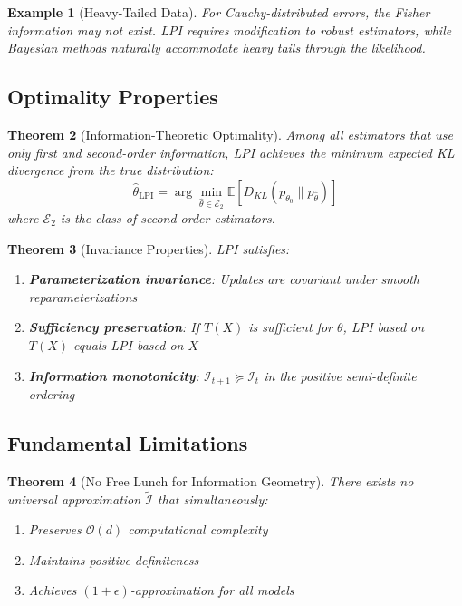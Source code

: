 \documentclass[11pt]{article}
\newtheorem{theorem}{Theorem}
\newtheorem{example}[theorem]{Example}
\begin{document}
\begin{example}[Heavy-Tailed Data]
For Cauchy-distributed errors, the Fisher information may not exist. LPI requires modification to robust estimators, while Bayesian methods naturally accommodate heavy tails through the likelihood.
\end{example}

\subsection{Optimality Properties}

\begin{theorem}[Information-Theoretic Optimality]
\label{thm:info_optimality}
Among all estimators that use only first and second-order information, LPI achieves the minimum expected KL divergence from the true distribution:
\begin{equation}
\hat{\theta}_{\text{LPI}} = \arg\min_{\hat{\theta} \in \mathcal{E}_2} \mathbb{E}[D_{KL}(p_{\theta_0} \| p_{\hat{\theta}})]
\end{equation}
where $\mathcal{E}_2$ is the class of second-order estimators.
\end{theorem}

\begin{theorem}[Invariance Properties]
LPI satisfies:
\begin{enumerate}
\item \textbf{Parameterization invariance}: Updates are covariant under smooth reparameterizations
\item \textbf{Sufficiency preservation}: If $T(X)$ is sufficient for $\theta$, LPI based on $T(X)$ equals LPI based on $X$
\item \textbf{Information monotonicity}: $\mathcal{I}_{t+1} \succeq \mathcal{I}_t$ in the positive semi-definite ordering
\end{enumerate}
\end{theorem}

\subsection{Fundamental Limitations}

\begin{theorem}[No Free Lunch for Information Geometry]
\label{thm:no_free_lunch}
There exists no universal approximation $\tilde{\mathcal{I}}$ that simultaneously:
\begin{enumerate}
\item Preserves $\mathcal{O}(d)$ computational complexity
\item Maintains positive definiteness
\item Achieves $(1+\epsilon)$-approximation for all models
\end{enumerate}
\end{theorem}
\end{document}
